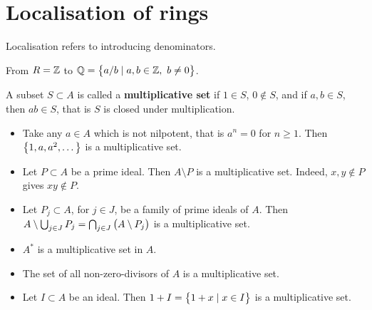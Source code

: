 \pagebreak

\section{Localisation of rings}

Localisation refers to introducing denominators.

\begin{example*}
From $ R = \mathbb{Z} $ to $ \Q = \cbr{a / b \mid a, b \in \Z, \ b \ne 0} $.
\end{example*}

\begin{definition}
A subset $ S \subset A $ is called a \textbf{multiplicative set} if $ 1 \in S $, $ 0 \not\in S $, and if $ a, b \in S $, then $ ab \in S $, that is $ S $ is closed under multiplication.
\end{definition}

\begin{example*}
\hfill
\begin{itemize}
\item Take any $ a \in A $ which is not nilpotent, that is $ a^n = 0 $ for $ n \ge 1 $. Then $ \cbr{1, a, a^2, \dots} $ is a multiplicative set.
\item Let $ P \subset A $ be a prime ideal. Then $ A \setminus P $ is a multiplicative set. Indeed, $ x, y \notin P $ gives $ xy \notin P $.
\item Let $ P_j \subset A $, for $ j \in J $, be a family of prime ideals of $ A $. Then $ A \setminus \bigcup_{j \in J} P_j = \bigcap_{j \in J} \br{A \setminus P_j} $ is a multiplicative set.
\item $ A^* $ is a multiplicative set in $ A $.
\item The set of all non-zero-divisors of $ A $ is a multiplicative set.
\item Let $ I \subset A $ be an ideal. Then $ 1 + I = \cbr{1 + x \mid x \in I} $ is a multiplicative set.
\end{itemize}
\end{example*}

